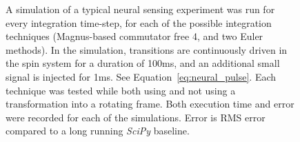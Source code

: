 \documentclass{jors}
\begin{document}
\begin{figure}[h!]
{			A simulation of a typical neural sensing experiment was run for every integration time-step, for each of the possible integration techniques (Magnus-based commutator free 4, and two Euler methods).
			In the simulation, transitions are continuously driven in the spin system for a duration of 100ms, and an additional small signal is injected for 1ms.
			See Equation~\eqref{eq:neural_pulse}.
			Each technique was tested while both using and not using a transformation into a rotating frame.
			Both execution time and error were recorded for each of the simulations.
			Error is RMS error compared to a long running \emph{SciPy} baseline.}
			\label{fig:benchmark_spin}
		\end{figure}
\end{document}
